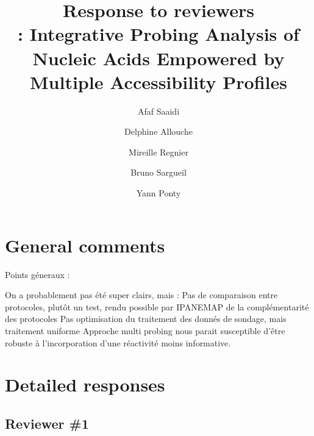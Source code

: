 \documentclass[9pt,hyperref]{article} %
\title{Response to reviewers\\[.3em]\OurTool{}:  Integrative Probing Analysis of Nucleic Acids Empowered by Multiple Accessibility Profiles}
\author{
Afaf Saaidi \and
Delphine Allouche \and
Mireille Regnier \and
Bruno Sargueil \and
Yann Ponty}
\date{} %
\begin{document}
\maketitle



\section{General comments}

	
Points géneraux :

On a probablement pas été super clairs, mais :
Pas de comparaison entre protocoles, plutôt un test, rendu possible par IPANEMAP de la complémentarité des protocoles
Pas optimisation du traitement des donnés de sondage, mais traitement uniforme
Approche multi probing nous parait susceptible d’être robuste à l’incorporation d’une réactivité moins informative.

\section{Detailed responses}

\subsection*{Reviewer \#1}
\end{document}
